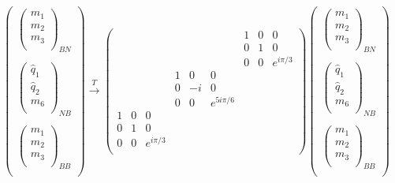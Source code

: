 \begin{align}
\left(\begin{matrix}
\left( \begin{matrix}
{m}_1\\
{m}_2\\
{m}_3\\
\end{matrix} \right)_{BN} \\
\\
\left( \begin{matrix}
\widehat{{q}}_1\\
\widehat{{q}}_2\\
{m}_6\\
\end{matrix} \right)_{NB}\\
\\
\left( \begin{matrix}
{m}_1\\
{m}_2\\
{m}_3\\
\end{matrix} \right)_{BB} \\
\end{matrix} \right)
\xrightarrow{T} \left( \begin{matrix}
&&&			&&&			1&0&0	\\
&&&			&&&			0&1&0	\\
&&&			&&&			0&0&e^{i \pi/3}	\\
&&&			1&0&0&			&&	\\
&&&			0&-i&0&			&&	\\
&&&			0&0&e^{5 i \pi /6}&			&&	\\
1&0&0&			&&&			&&	\\
0&1&0&			&&&			&&	\\
0&0&e^{i \pi /3}&			&&&			&&	\\		
\end{matrix} \right)
\left(\begin{matrix}
\left( \begin{matrix}
{m}_1\\
{m}_2\\
{m}_3\\
\end{matrix} \right)_{BN} \\
\\
\left( \begin{matrix}
\widehat{{q}}_1\\
\widehat{{q}}_2\\
{m}_6\\
\end{matrix} \right)_{NB}\\
\\
\left( \begin{matrix}
{m}_1\\
{m}_2\\
{m}_3\\
\end{matrix} \right)_{BB} \\
\end{matrix} \right)
\end{align}
